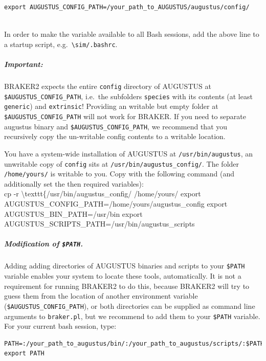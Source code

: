 \documentclass[]{article}
\let\oldsubparagraph\subparagraph
\renewcommand{\subparagraph}[1]{\oldsubparagraph{#1}\mbox{}}
\begin{document}
\begin{verbatim}
export AUGUSTUS_CONFIG_PATH=/your_path_to_AUGUSTUS/augustus/config/
    
\end{verbatim}

In order to make the variable available to all Bash sessions, add the
above line to a startup script,
e.g.~\texttt{\textbackslash{}sim/.bashrc}.

\subparagraph{Important:}\label{important}

BRAKER2 expects the entire \texttt{config} directory of AUGUSTUS at
\texttt{\$AUGUSTUS\_CONFIG\_PATH}, i.e.~the subfolders \texttt{species}
with its contents (at least \texttt{generic}) and \texttt{extrinsic}!
Providing an writable but empty folder at
\texttt{\$AUGUSTUS\_CONFIG\_PATH} will not work for BRAKER. If you need
to separate augustus binary and \texttt{\$AUGUSTUS\_CONFIG\_PATH}, we
recommend that you recursively copy the un-writable config contents to a
writable location.

You have a system-wide installation of AUGUSTUS at
\texttt{/usr/bin/augustus}, an unwritable copy of \texttt{config} sits
at \texttt{/usr/bin/augustus\_config/}. The folder \texttt{/home/yours/}
is writable to you. Copy with the following command (and additionally
set the then required variables):\\
cp -r \textbackslash{}texttt\{/usr/bin/augustus\_config/ /home/yours/
export AUGUSTUS\_CONFIG\_PATH=/home/yours/augustus\_config export
AUGUSTUS\_BIN\_PATH=/usr/bin export
AUGUSTUS\_SCRIPTS\_PATH=/usr/bin/augustus\_scripts

\subparagraph{\texorpdfstring{Modification of
\texttt{\$PATH}.}{Modification of \$PATH.}}\label{modification-of-path.}

Adding adding directories of AUGUSTUS binaries and scripts to your
\texttt{\$PATH} variable enables your system to locate these tools,
automatically. It is not a requirement for running BRAKER2 to do this,
because BRAKER2 will try to guess them from the location of another
environment variable (\texttt{\$AUGUSTUS\_CONFIG\_PATH}), or both
directories can be supplied as command line arguments to
\texttt{braker.pl}, but we recommend to add them to your \texttt{\$PATH}
variable. For your current bash session, type:

\begin{verbatim}
PATH=:/your_path_to_augustus/bin/:/your_path_to_augustus/scripts/:$PATH
export PATH
    
\end{verbatim}
\end{document}
